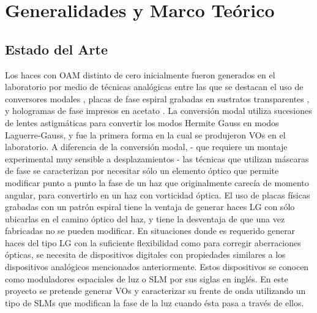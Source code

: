 

\chapter{Generalidades y Marco Teórico}
\label{cha:Gen_intro}

\graphicspath{{Figures/ch2_img/}{../Figures/ch2_img/}}

\section{Estado del Arte} %
\label{sec:ChGen_estado_del_arte}
Los haces con \acrshort{OAM} distinto de cero inicialmente fueron generados en el
laboratorio por medio de técnicas analógicas entre las que se destacan
el uso de conversores modales , placas de fase espiral grabadas en sustratos
transparentes , y hologramas de fase impresos en acetato
 . La conversión modal utiliza sucesiones de
lentes astigmáticas para convertir los modos Hermite Gauss en modos
Laguerre-Gauss, y fue la primera forma en la cual se produjeron VOs en
el laboratorio. A diferencia de la conversión modal, - que requiere un
montaje experimental muy sensible a desplazamientos -  las técnicas que utilizan máscaras
de fase se caracterizan por necesitar sólo un elemento óptico que
permite modificar punto a punto la fase de un haz que originalmente
carecía de momento angular, para convertirlo en un haz con vorticidad
óptica. El uso de placas físicas grabadas con un patrón espiral
tiene la ventaja de generar haces LG con sólo ubicarlas en
el camino óptico del haz, y tiene la desventaja de que una vez
fabricadas no se pueden modificar. 
En situaciones donde es requerido generar haces del tipo LG con la suficiente
flexibilidad como para corregir aberraciones ópticas, se
necesita de dispositivos digitales con propiedades similares a los
dispositivos analógicos mencionados anteriormente. Estos dispositivos
se conocen como moduladores espaciales de luz o SLM por sus siglas en
inglés. En este proyecto se pretende generar VOs y caracterizar su
frente de onda utilizando un tipo de SLMs que modifican la fase de la
luz cuando ésta pasa a través de ellos. 

